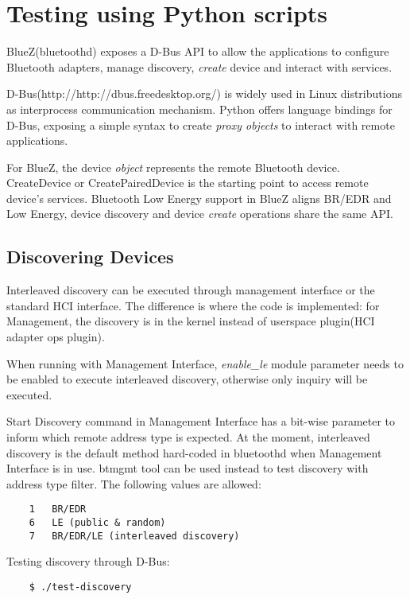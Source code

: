 \documentclass[11pt]{article}
\begin{document}
\section{Testing using Python scripts}

BlueZ(bluetoothd) exposes a D-Bus API to allow the applications to configure
Bluetooth adapters, manage discovery, {\em create} device and interact with
services.

D-Bus(http://http://dbus.freedesktop.org/) is widely used in Linux
distributions as interprocess communication mechanism. Python offers
language bindings for D-Bus, exposing a simple syntax to create 
{\em proxy objects} to interact with remote applications.

For BlueZ, the device {\em object} represents the remote Bluetooth device.
CreateDevice or CreatePairedDevice is the starting point to access
remote device's services. Bluetooth Low Energy support in BlueZ aligns
BR/EDR and Low Energy, device discovery and device {\em create} operations
share the same API.

\subsection{Discovering Devices}

Interleaved discovery can be executed through management interface or the
standard HCI interface. The difference is where the code is implemented:
for Management, the discovery is in the kernel instead of userspace
plugin(HCI adapter ops plugin).

When running with Management Interface, {\em enable\_le} module parameter
needs to be enabled to execute interleaved discovery, otherwise only
inquiry will be executed.

Start Discovery command in Management Interface has a bit-wise parameter to
inform which remote address type is expected. At the moment, interleaved
discovery is the default method hard-coded in bluetoothd when Management
Interface is in use. btmgmt tool can be used instead to test discovery
with address type filter. The following values are allowed:

\begin{verbatim}
	1   BR/EDR
	6   LE (public & random)
	7   BR/EDR/LE (interleaved discovery)
\end{verbatim}

Testing discovery through D-Bus:
\begin{verbatim}
	$ ./test-discovery
\end{verbatim}
\end{document}
